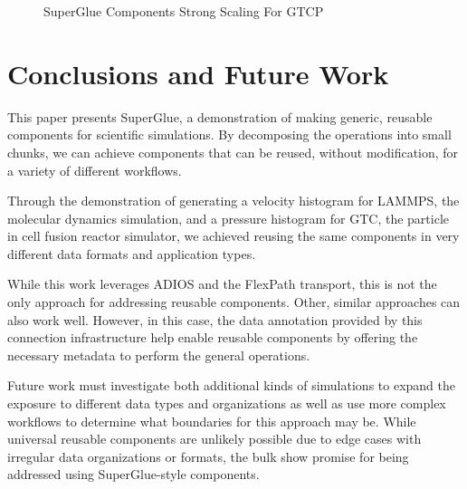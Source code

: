 \documentclass[conference]{IEEEtran}
\begin{document}
\begin{figure}[t!]
\center
{}
\caption{SuperGlue Components Strong Scaling For GTCP}
\label{fig:gtcp-strong}
\end{figure}

\section{Conclusions and Future Work}
\label{s:conclusion}

This paper presents SuperGlue, a demonstration of making generic, reusable
components for scientific simulations. By decomposing the operations into small
chunks, we can achieve components that can be reused, without modification, for
a variety of different workflows.

Through the demonstration of generating a velocity histogram for LAMMPS, the
molecular dynamics simulation, and a pressure histogram for GTC, the particle
in cell fusion reactor simulator, we achieved reusing the same components in
very different data formats and application types.

While this work leverages ADIOS and the FlexPath transport, this is not the
only approach for addressing reusable components. Other, similar approaches can
also work well. However, in this case, the data annotation provided by this
connection infrastructure help enable reusable components by offering the
necessary metadata to perform the general operations.

Future work must investigate both additional kinds of simulations to expand the
exposure to different data types and organizations as well as use more complex
workflows to determine what boundaries for this approach may be. While
universal reusable components are unlikely possible due to edge cases with
irregular data organizations or formats, the bulk show promise for being
addressed using SuperGlue-style components.
\end{document}
